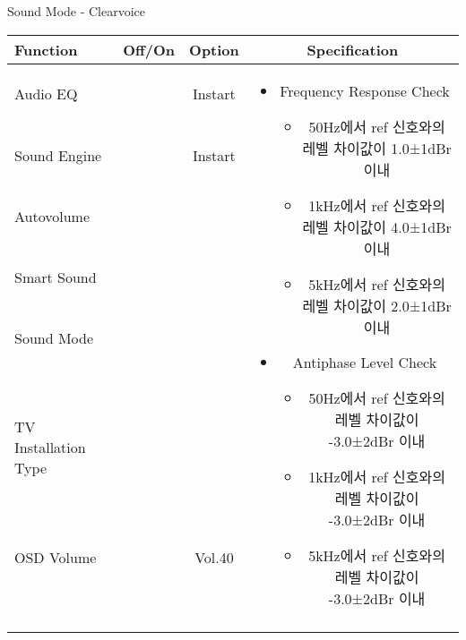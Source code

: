 \begin{frame}[t]{Sound Mode - Clearvoice}
\begin{tiny}
\begin{tabular}{@{}lccc@{}}
\toprule
Function & Off/On & Option & Specification \\
\midrule
Audio EQ & \color{black}{Off} & Instart &
\multirow{10}{60mm}{
\begin{itemize}
\item Frequency Response Check
	\begin{itemize}
	\item 50Hz에서 ref 신호와의 레벨 차이값이 1.0±1dBr 이내
	\item 1kHz에서 ref 신호와의 레벨 차이값이 4.0±1dBr 이내
	\item 5kHz에서 ref 신호와의 레벨 차이값이 2.0±1dBr 이내
	\end{itemize}
\item Antiphase Level Check
	\begin{itemize}
	\item 50Hz에서 ref 신호와의 레벨 차이값이 -3.0±2dBr 이내
	\item 1kHz에서 ref 신호와의 레벨 차이값이 -3.0±2dBr 이내
	\item 5kHz에서 ref 신호와의 레벨 차이값이 -3.0±2dBr 이내
	\end{itemize}
\end{itemize}
} \\
Sound Engine & \color{blue}{On} & Instart & \\
Autovolume & \color{black}{Off} & & \\
Smart Sound & \color{black}{Off} & & \\
Sound Mode & \color{blue}{On} & \color{blue}{Clearvoice} & \\
TV Installation Type & \color{blue}{On} & \color{black}{Standtype1} & \\
OSD Volume & \color{blue}{On} & Vol.40 & \\
& & & \\
& & & \\
& & & \\
& & & \\
\midrule
\end{tabular}
\end{tiny}


\end{frame}